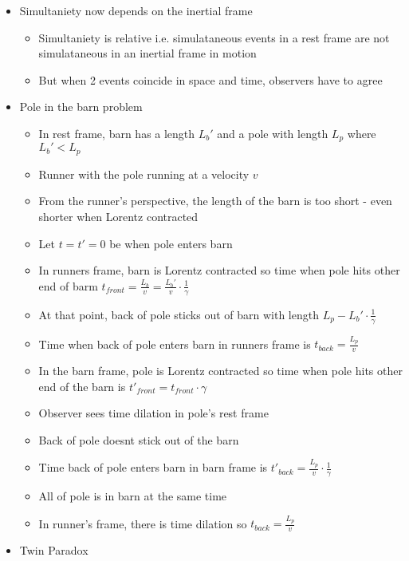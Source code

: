 \documentclass[12pt]{article}
\begin{document}
\begin{itemize}
    \item Simultaniety now depends on the inertial frame \begin{itemize}
        \item Simultaniety is relative i.e. simulataneous events in a rest frame are not simulataneous in an inertial frame in motion
        \item But when 2 events coincide in space and time, observers have to agree
    \end{itemize}
    \item Pole in the barn problem \begin{itemize}
        \item In rest frame, barn has a length $L_b'$ and a pole with length $L_p$ where $L_b' < L_p$
        \item Runner with the pole running at a velocity $v$
        \item From the runner's perspective, the length of the barn is too short - even shorter when Lorentz contracted
        \item Let $t = t' = 0$ be when pole enters barn
        \item In runners frame, barn is Lorentz contracted so time when pole hits other end of barm $t_{front} = \frac{L_b}{v} = \frac{L_b'}{v} \cdot \frac{1}{\gamma}$
        \item At that point, back of pole sticks out of barn with length $L_p - L_b' \cdot \frac{1}{\gamma}$
        \item Time when back of pole enters barn in runners frame is $t_{back} = \frac{L_p}{v}$
        \item In the barn frame, pole is Lorentz contracted so time when pole hits other end of the barn is $t'_{front} = t_{front} \cdot \gamma$
        \item Observer sees time dilation in pole's rest frame
        \item Back of pole doesnt stick out of the barn
        \item Time back of pole enters barn in barn frame is $t'_{back} = \frac{L_p}{v} \cdot \frac{1}{\gamma}$
        \item All of pole is in barn at the same time
        \item In runner's frame, there is time dilation so $t_{back} = \frac{L_p}{v}$
    \end{itemize}
    \item Twin Paradox \begin{itemize}

\end{itemize}
\end{itemize}
\end{document}
